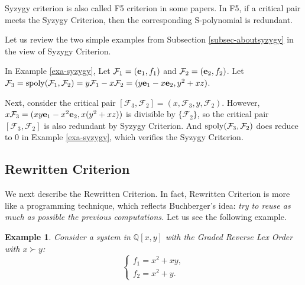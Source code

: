 \documentclass[preprint,authoryear,3p,12pt]{elsarticle}
\newtheorem{example}[theorem]{Example}
\def\eb{{\bf e}}
\def\sp{{\rm spoly}}
\def\Q{{\mathbb{Q}}}
\newcommand{\ignore}[1]{}
\begin{document}
Syzygy criterion is also called F5 criterion in some papers. In  F5, if a critical pair meets the Syzygy Criterion, then the
corresponding S-polynomial is redundant.

 Let us review the two
simple examples from Subsection \ref{subsec-aboutsyzygy} in the view of Syzygy Criterion.

\ignore{
In Example \ref{exa-buchbergersyzygy}, Let ${\mathcal F}_1=(\eb_1, f_1)$ and ${\mathcal F}_2=(\eb_2, f_2)$. For the critical pair
$[{\mathcal F}_1, {\mathcal F}_2]=(y^2, {\mathcal F}_1, x^2, {\mathcal F}_2)$, it is easy to check $y^2{\mathcal F}_1$ is
divisible by $\{{\mathcal F}_2\}$. the critical pair $[{\mathcal F}_1, {\mathcal F}_2]$ meets the Syzygy Criterion, Therefore,
its S-polynomial is  redundant. This is correct, since its S-polynomial reduces to $0$ in Example \ref{exa-buchbergersyzygy}.}

In Example \ref{exa-syzygy}, Let ${\mathcal F}_1=(\eb_1, f_1)$ and ${\mathcal F}_2=(\eb_2, f_2)$. Let
  ${\mathcal F}_3=\sp ({\mathcal F}_1 , {\mathcal F}_2 )=y{\mathcal F}_1-x{\mathcal F}_2=(y\eb_1-x\eb_2, y^2+xz)$.

Next, consider the critical pair $[{\mathcal F}_3, {\mathcal F}_2]=(x, {\mathcal F}_3, y, {\mathcal F}_2)$. However, $x{\mathcal
F}_3=(xy\eb_1-x^2\eb_2, x(y^2+xz))$ is divisible by $\{ {\mathcal F}_2\}$, so the critical pair $[{\mathcal F}_3, {\mathcal
F}_2]$ is also redundant by Syzygy Criterion. And $\sp({\mathcal F}_3, {\mathcal F}_2)$ does reduce to $0$ in Example
\ref{exa-syzygy}, which verifies the Syzygy Criterion.


\subsection{Rewritten Criterion}

We next describe the Rewritten Criterion. In fact, Rewritten
Criterion is more like a programming technique, which reflects
Buchberger's idea: {\em try to reuse as much as possible the
previous computations.} Let us see the following example.

\begin{example} \label{exa-rew}
Consider a system in $\Q[x, y]$ with the Graded Reverse Lex Order with $x\succ y$:
$$\left\{\begin{array}{l} f_1=x^2+xy, \\
f_2=x^2+y.
\end{array}\right. $$
\end{example}
\end{document}

